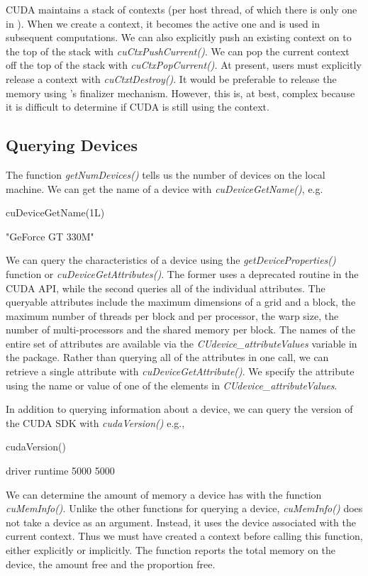 \documentclass[article]{jss}
\def\R{\proglang{R}}
\def\Rfunc#1{\textsl{#1()}}
\def\Rvar#1{\textsl{#1}}
\begin{document}
CUDA maintains a stack of contexts (per host thread, of which there
is only one in \R).  When we create a context, it becomes the active
one and is used in subsequent computations.  We can also explicitly
push an existing context on to the top of the stack with
\Rfunc{cuCtxPushCurrent}.  We can pop the current context off the top
of the stack with \Rfunc{cuCtxPopCurrent}.  At present, \R{} users
must explicitly release a context with \Rfunc{cuCtxtDestroy}.  It
would be preferable to release the memory using \R's finalizer
mechanism. However, this is, at best, complex because it is difficult
to determine if CUDA is still using the context.


\subsection{Querying Devices}
The function \Rfunc{getNumDevices} tells us the number of devices on
the local machine.  
We can get the name of a device with \Rfunc{cuDeviceGetName}, e.g.
\begin{RCode}
cuDeviceGetName(1L)
\end{RCode}
\begin{ROutput}
[1] "GeForce GT 330M"
\end{ROutput}
We can query the characteristics of a device using
the \Rfunc{getDeviceProperties} function or
\Rfunc{cuDeviceGetAttributes}.  The former uses a deprecated routine
in the CUDA API, while the second queries all of the individual
attributes.  The queryable attributes include the maximum dimensions
of a grid and a block, the maximum number of threads per block and per
processor, the warp size, the number of multi-processors and the shared
memory per block.  The names of the entire set of attributes are
available  via the \Rvar{CUdevice\_attributeValues} variable in the package.
Rather than querying all of the attributes in one call,
we can retrieve a single attribute with \Rfunc{cuDeviceGetAttribute}.
We specify the attribute using the name or value of one 
of the elements in \Rvar{CUdevice\_attributeValues}.


In addition to querying information about a device,
we can query the version of the CUDA SDK with
\Rfunc{cudaVersion} e.g.,
\begin{RCode}
cudaVersion()
\end{RCode}
\begin{ROutput}
 driver runtime 
   5000    5000 
\end{ROutput}


We can determine the amount of memory a device has with the function
\Rfunc{cuMemInfo}. Unlike the other functions for querying a device,
\Rfunc{cuMemInfo} does not take a device as an argument. Instead, it uses the device
associated with the current context.  Thus we must have created a
context before calling this function, either explicitly or implicitly.
The function reports the total memory on the device, the amount free
and the proportion free.
\end{document}
